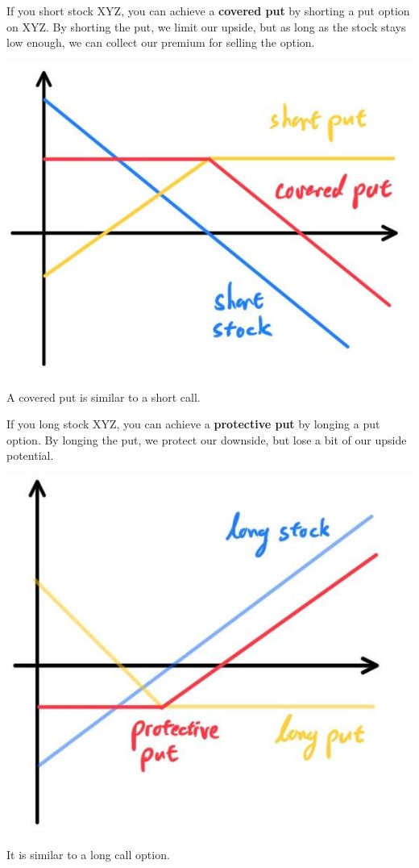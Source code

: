 \documentclass{article}
\begin{document}
    \begin{definition}
      If you short stock XYZ, you can achieve a \textbf{covered put} by shorting a put option on XYZ. By shorting the put, we limit our upside, but as long as the stock stays low enough, we can collect our premium for selling the option. 
      \begin{center}
        \includegraphics[scale=0.3]{img/covered_put.jpg}
      \end{center}
      A covered put is similar to a short call. 
    \end{definition}

    \begin{definition}
      If you long stock XYZ, you can achieve a \textbf{protective put} by longing a put option. By longing the put, we protect our downside, but lose a bit of our upside potential. 
      \begin{center}
        \includegraphics[scale=0.3]{img/protective_put.jpg}
      \end{center}
      It is similar to a long call option. 
    \end{definition}
\end{document}
